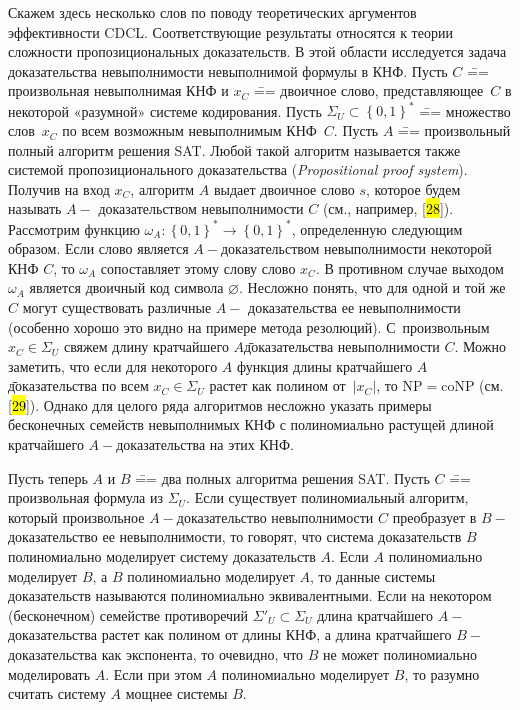 Скажем здесь несколько слов по поводу теоретических аргументов эффективности CDCL. Соответствующие результаты относятся к теории сложности пропозициональных доказательств. В этой области исследуется задача доказательства невыполнимости невыполнимой формулы в КНФ. Пусть $C$ \=== произвольная невыполнимая КНФ и $x_{C}$ \=== двоичное слово, представляющее~$C$ в некоторой «разумной» системе кодирования. Пусть $\Sigma_{U} \subset \left\{ 0,1 \right\}^{*}$ \=== множество слов~$x_{C}$ по всем возможным невыполнимым КНФ~$C$. Пусть $A$ \=== произвольный полный алгоритм решения SAT. Любой такой алгоритм называется также системой пропозиционального доказательства (\textit{Propositional proof system}). Получив на вход $x_{C}$, алгоритм $A$ выдает двоичное слово $s$, которое будем называть $A -$ доказательством невыполнимости $C$ (см., например, {[}\hl{28}{]}). Рассмотрим функцию $\omega_{A}:\left\{ 0,1 \right\}^{*} \to \left\{ 0,1 \right\}^{*}$, определенную следующим образом. Если слово является $A -$доказательством невыполнимости некоторой КНФ $C$, то $\omega_{A}$ сопоставляет этому слову слово $x_{C}$. В противном случае выходом $\omega_{A}$ является двоичный код символа $\varnothing$. Несложно понять, что для одной и той же $C$ могут существовать различные $A -$ доказательства ее невыполнимости (особенно хорошо это видно на примере метода резолюций). С~произвольным $x_{C} \in \Sigma_{U}$ свяжем длину кратчайшего $A $\=доказательства невыполнимости $C$. Можно заметить, что если для некоторого $A$ функция длины кратчайшего $A $\=доказательства по всем $x_{C} \in \Sigma_{U}$ растет как полином от~$|x_{C}|$, то $\mathrm{NP} = \mathrm{coNP}$ (см. {[}\hl{29}{]}). Однако для целого ряда алгоритмов несложно указать примеры бесконечных семейств невыполнимых КНФ с полиномиально растущей длиной кратчайшего $A -$доказательства на этих КНФ.

Пусть теперь $A$ и $B$ \=== два полных алгоритма решения SAT. Пусть $C$ \=== произвольная формула из $\Sigma_{U}$. Если существует полиномиальный алгоритм, который произвольное $A -$доказательство невыполнимости $C$ преобразует в $B -$доказательство ее невыполнимости, то говорят, что система доказательств $B$ полиномиально моделирует систему доказательств $A$. Если $A$ полиномиально моделирует $B$, а $B$ полиномиально моделирует $A$, то данные системы доказательств называются полиномиально эквивалентными. Если на некотором (бесконечном) семействе противоречий ${\Sigma'}_{U} \subset \Sigma_{U}$ длина кратчайшего $A -$доказательства растет как полином от длины КНФ, а длина кратчайшего $B -$ доказательства как экспонента, то очевидно, что $B$ не может полиномиально моделировать $A$. Если при этом $A$ полиномиально моделирует $B$, то разумно считать систему $A$ мощнее системы $B$.

